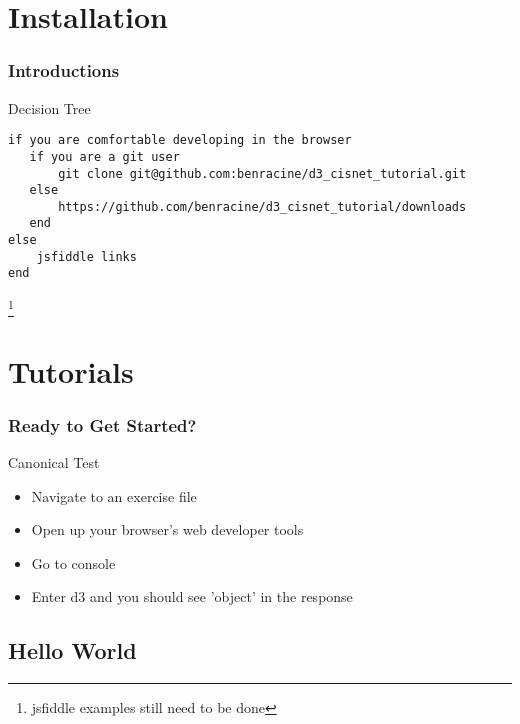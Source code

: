 \documentclass{beamer}
\begin{document}
\section{Installation}

\begin{frame}[fragile]
    \frametitle{Introductions}
    \begin{block}{Decision Tree}
        \tiny{
        \begin{verbatim}
if you are comfortable developing in the browser
   if you are a git user
       git clone git@github.com:benracine/d3_cisnet_tutorial.git
   else
       https://github.com/benracine/d3_cisnet_tutorial/downloads
   end
else
    jsfiddle links
end
        \end{verbatim}
        }
    \end{block}
    \footnote{jsfiddle examples still need to be done}
\end{frame}


\section{Tutorials}


\begin{frame}
    \frametitle{Ready to Get Started?}
    \begin{block}{Canonical Test}
        \begin{itemize}
        \pause
        \item Navigate to an exercise file
        \pause
        \item Open up your browser's web developer tools
        \pause
        \item Go to console
        \pause
        \item Enter d3 and you should see 'object' in the response
        \end{itemize}
    \end{block}
\end{frame}


\subsection{Hello World}
\end{document}

